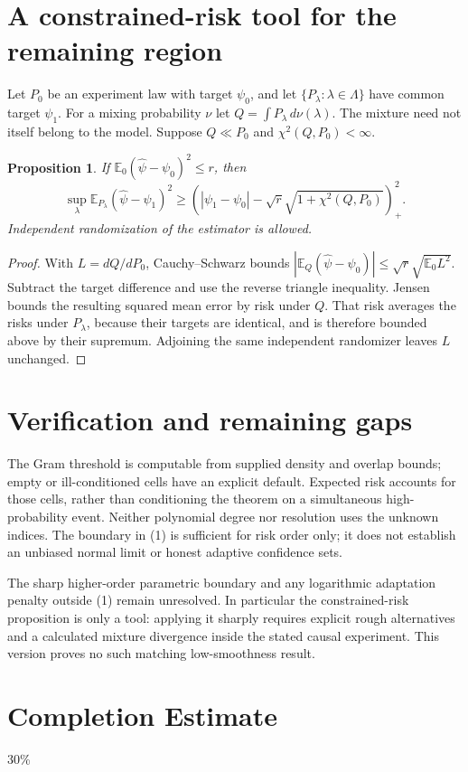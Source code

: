 \documentclass[11pt]{article}
\newtheorem{proposition}[theorem]{Proposition}
\theoremstyle{remark}
\newcommand{\E}{\mathbb E}
\begin{document}
\section{A constrained-risk tool for the remaining region}
Let $P_0$ be an experiment law with target $\psi_0$, and let
$\{P_\lambda:\lambda\in\Lambda\}$ have common target $\psi_1$.
For a mixing probability $\nu$ let $Q=\int P_\lambda\,d\nu(\lambda)$.
The mixture need not itself belong to the model. Suppose $Q\ll P_0$
and $\chi^2(Q,P_0)<\infty$.
\begin{proposition}
If $\E_0(\widehat\psi-\psi_0)^2\le r$, then
\[
 \sup_\lambda\E_{P_\lambda}(\widehat\psi-\psi_1)^2
 \ge\left(|\psi_1-\psi_0|-
       \sqrt{r}\sqrt{1+\chi^2(Q,P_0)}\right)_+^2.
\]
Independent randomization of the estimator is allowed.
\end{proposition}
\begin{proof}
With $L=dQ/dP_0$, Cauchy--Schwarz bounds
$|\E_Q(\widehat\psi-\psi_0)|\le\sqrt r\sqrt{\E_0L^2}$.
Subtract the target difference and use the reverse triangle inequality.
Jensen bounds the resulting squared mean error by risk under $Q$.
That risk averages the risks under $P_\lambda$, because their targets
are identical, and is therefore bounded above by their supremum.
Adjoining the same independent randomizer leaves $L$ unchanged.
\end{proof}

\section{Verification and remaining gaps}
The Gram threshold is computable from supplied density and overlap bounds;
empty or ill-conditioned cells have an explicit default. Expected risk
accounts for those cells, rather than conditioning the theorem on a
simultaneous high-probability event. Neither polynomial degree nor
resolution uses the unknown indices. The boundary in (1) is sufficient
for risk order only; it does not establish an unbiased normal limit or
honest adaptive confidence sets.

The sharp higher-order parametric boundary and any logarithmic adaptation
penalty outside (1) remain unresolved. In particular the constrained-risk
proposition is only a tool: applying it sharply requires explicit rough
alternatives and a calculated mixture divergence inside the stated causal
experiment. This version proves no such matching low-smoothness result.

\section{Completion Estimate}
30\%
\end{document}
